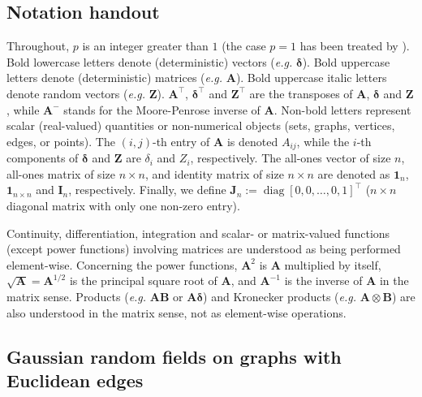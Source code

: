 \documentclass[12pt]{article}
\theoremstyle{plain}
\theoremstyle{remark}
\newcommand{\onen}[0]{{\mathbf{1}_{n}}}
\newcommand{\onenn}[0]{{\mathbf{1}_{n\times n}}}
\newcommand{\eg}{\textit{e.g. }}
\newcommand{\dVec}[1]{{\bm{#1}}}            %
\newcommand{\latMatr}[1]{\mathbf{#1}}          %
\newcommand{\rVec}[1]{{\bm{#1}}}            %
\DeclareMathOperator{\diag}{diag}
\begin{document}
\subsection{Notation handout}
    \label{ssec:notation}
    Throughout, $p$ is an integer greater than $1$ (the case $p=1$ has been treated by \cite{anderes_isotropic_2020}).
    Bold lowercase letters denote (deterministic) vectors (\eg $\dVec{\delta}$). Bold uppercase letters denote (deterministic) matrices (\eg $\latMatr{A}$). Bold uppercase italic letters denote random vectors (\eg $\rVec{Z}$). $\latMatr{A}^\top$, $\dVec{\delta}^\top$ and $\rVec{Z}^\top$ are the transposes of $\latMatr{A}$, $\dVec{\delta}$ and $\rVec{Z}$, while $\latMatr{A}^-$ stands for the Moore-Penrose inverse of $\latMatr{A}$. Non-bold letters represent scalar (real-valued) quantities or non-numerical objects (sets, graphs, vertices, edges, or points). The $(i,j)$-th entry of $\latMatr{A}$ is denoted ${A}_{ij}$, while the $i$-th components of $\dVec{\delta}$ and $\rVec{Z}$ are ${\delta}_i$ and ${Z}_i$, respectively. The all-ones vector of size $n$, all-ones matrix of size $n \times n$, {and identity matrix of size $n\times n$} are denoted as $\onen$, $\onenn$ and $\latMatr{I}_n$, respectively. Finally, we define $\latMatr{J}_n := \diag{[   0, 0, \dots, 0, 1]^\top}$ ($n \times n$ diagonal matrix with only one non-zero entry).
    
    Continuity, differentiation, integration and scalar- or matrix-valued functions (except power functions) involving matrices are understood as being performed element-wise. Concerning the power functions, $\latMatr{A}^2$ is $\latMatr{A}$ multiplied by itself, $\sqrt{\latMatr{A}}=\latMatr{A}^{1/2}$ is the principal square root of $\latMatr{A}$, and $\latMatr{A}^{-1}$ is the inverse of $\latMatr{A}$ in the matrix sense. Products (\eg $\latMatr{A} \latMatr{B}$ or $\latMatr{A} \dVec{\delta}$) and Kronecker products (\eg $\latMatr{A} \otimes \latMatr{B}$) are also understood in the matrix sense, not as element-wise operations.


\subsection{Gaussian {random fields} on graphs with Euclidean edges}
    \label{ssec:graphsWithEE}
\end{document}

